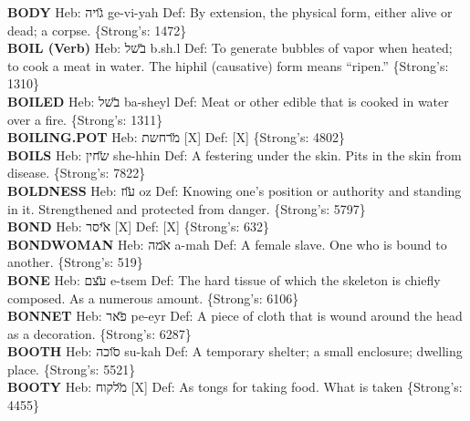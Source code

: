 {\textbf{BODY} Heb: {\large\H גויה} ge-vi-yah Def: By extension, the physical form, either alive or dead; a corpse. \{Strong's: 1472\}\hfill{}\\

\textbf{BOIL (Verb)} Heb: {\large\H בשל} b.sh.l Def: To generate bubbles of vapor when heated; to cook a meat in water. The hiphil (causative) form means ``ripen.'' \{Strong's: 1310\}\hfill{}\\

\textbf{BOILED} Heb: {\large\H בשל} ba-sheyl Def: Meat or other edible that is cooked in water over a fire. \{Strong's: 1311\}\hfill{}\\

\textbf{BOILING.POT} Heb: {\large\H מרחשת} {[}X{]} Def: {[}X{]} \{Strong's: 4802\}\hfill{}\\

\textbf{BOILS} Heb: {\large\H שחין} she-hhin Def: A festering under the skin. Pits in the skin from disease. \{Strong's: 7822\}\hfill{}\\

\textbf{BOLDNESS} Heb: {\large\H עוז} oz Def: Knowing one's position or authority and standing in it. Strengthened and protected from danger. \{Strong's: 5797\}\hfill{}\\

\textbf{BOND} Heb: {\large\H איסר} {[}X{]} Def: {[}X{]} \{Strong's: 632\}\hfill{}\\

\textbf{BONDWOMAN} Heb: {\large\H אמה} a-mah Def: A female slave. One who is bound to another. \{Strong's: 519\}\hfill{}\\

\textbf{BONE} Heb: {\large\H עצם} e-tsem Def: The hard tissue of which the skeleton is chiefly composed. As a numerous amount. \{Strong's: 6106\}\hfill{}\\

\textbf{BONNET} Heb: {\large\H פאר} pe-eyr Def: A piece of cloth that is wound around the head as a decoration. \{Strong's: 6287\}\hfill{}\\

\textbf{BOOTH} Heb: {\large\H סוכה} su-kah Def: A temporary shelter; a small enclosure; dwelling place. \{Strong's: 5521\}\hfill{}\\

\textbf{BOOTY} Heb: {\large\H מלקוח} {[}X{]} Def: As tongs for taking food. What is taken \{Strong's: 4455\}\hfill{}\\

}
